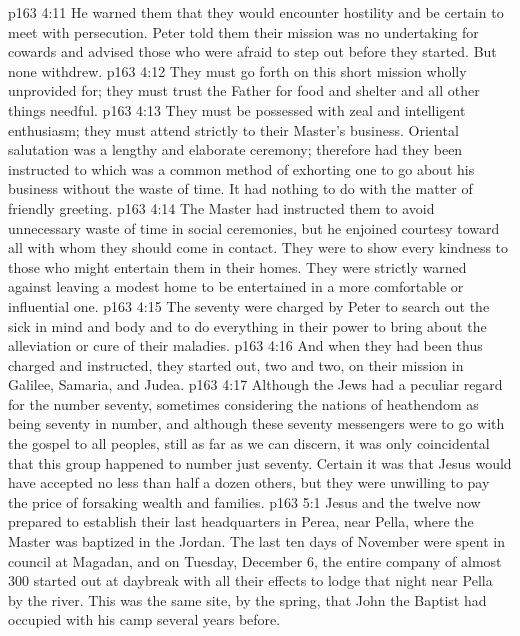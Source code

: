 \vs p163 4:11 \bibnobreakspace {} He warned them that they would encounter hostility and be certain to meet with persecution. Peter told them their mission was no undertaking for cowards and advised those who were afraid to step out before they started. But none withdrew.
\vs p163 4:12 \bibnobreakspace {} They must go forth on this short mission wholly unprovided for; they must trust the Father for food and shelter and all other things needful.
\vs p163 4:13 \bibnobreakspace {} They must be possessed with zeal and intelligent enthusiasm; they must attend strictly to their Master’s business. Oriental salutation was a lengthy and elaborate ceremony; therefore had they been instructed to  which was a common method of exhorting one to go about his business without the waste of time. It had nothing to do with the matter of friendly greeting.
\vs p163 4:14 \bibnobreakspace {} The Master had instructed them to avoid unnecessary waste of time in social ceremonies, but he enjoined courtesy toward all with whom they should come in contact. They were to show every kindness to those who might entertain them in their homes. They were strictly warned against leaving a modest home to be entertained in a more comfortable or influential one.
\vs p163 4:15 \bibnobreakspace {} The seventy were charged by Peter to search out the sick in mind and body and to do everything in their power to bring about the alleviation or cure of their maladies.
\vs p163 4:16 \pc And when they had been thus charged and instructed, they started out, two and two, on their mission in Galilee, Samaria, and Judea.
\vs p163 4:17 Although the Jews had a peculiar regard for the number seventy, sometimes considering the nations of heathendom as being seventy in number, and although these seventy messengers were to go with the gospel to all peoples, still as far as we can discern, it was only coincidental that this group happened to number just seventy. Certain it was that Jesus would have accepted no less than half a dozen others, but they were unwilling to pay the price of forsaking wealth and families.
\vs p163 5:1 Jesus and the twelve now prepared to establish their last headquarters in Perea, near Pella, where the Master was baptized in the Jordan. The last ten days of November were spent in council at Magadan, and on Tuesday, December 6, the entire company of almost 300 started out at daybreak with all their effects to lodge that night near Pella by the river. This was the same site, by the spring, that John the Baptist had occupied with his camp several years before.
